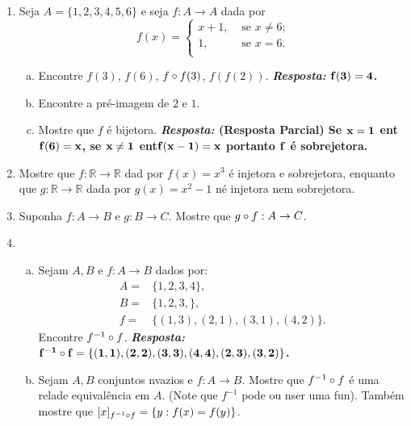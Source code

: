 \begin{enumerate}[{\bf 1.}]

\item Seja $A=\{1,2,3,4,5,6\}$ e seja $f:A\to A$ dada por 
\begin{equation*}
 f(x)=\left\{ \begin{array}{lc}
x+1, & \textrm{ se $x\neq 6$;} \\
1,    & \textrm{ se $x=    6$.} \\
\end{array}\right.   
\end{equation*}
\begin{enumerate}[a)]
\item Encontre $f(3)$, $f(6)$, $f\circ f(3)$, $f(f(2))$. {\bf{\it Resposta:} ${\bf f(3)=4}$.}
\item Encontre a pr\'e-imagem de $2$ e $1$.
\item Mostre que $f$ \'e bijetora. {\bf{\it Resposta:} (Resposta Parcial) Se ${\bf x=1}$ ent\ao ${\bf f(6)=x}$, se ${\bf x\neq 1}$ ent\ao ${\bf f(x-1)=x}$ portanto ${\bf f}$ \'e sobrejetora.}
\end{enumerate}

\item Mostre que $f:\mathbb{R}\to\mathbb{R}$ dad por $f(x)=x^3$ \'e injetora e sobrejetora, enquanto que $g:\mathbb{R}\to\mathbb{R}$ dada por $g(x)=x^2-1$ n\ao \'e injetora nem sobrejetora. 

\item\label{funcexerc3} Suponha $f:A\to B$ e $g:B\to C$. Mostre que $g\circ f:A\to C$.

\item \begin{enumerate}[a)]
\item Sejam $A,B$ e $f:A\to B$ dados por:
\begin{equation*}
 \begin{aligned}
A=&\{1,2,3,4\},\\
B=&\{1,2,3,\},\\
f=&\{(1,3),(2,1),(3,1),(4,2)\}.
 \end{aligned}
\end{equation*}
Encontre $f^{-1}\circ f$.
{\bf{\it Resposta:} ${\bf f^{-1}\circ f=\{(1,1),(2,2),(3,3),(4,4),(2,3),(3,2)\}}$.}

\item Sejam $A,B$ conjuntos n\ao vazios e $f:A\to B$. Mostre que $f^{-1}\circ f$ \'e uma rela\cao de equival\^encia em $A$. (Note que $f^{-1}$ pode ou n\ao ser uma fun\caoi). Tamb\'em mostre que $[x]_{f^{-1}\circ f}=\{y: f(x)=f(y)\}$.
\end{enumerate}


\end{enumerate}
